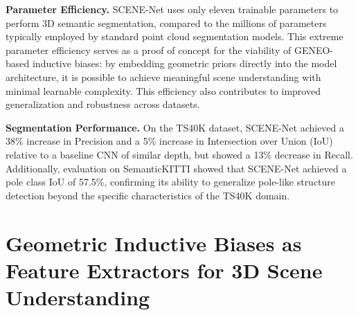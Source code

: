 \textbf{Parameter Efficiency.} \;
SCENE-Net uses only eleven trainable parameters to perform 3D semantic
segmentation, compared to the millions of parameters typically employed by
standard point cloud segmentation models. This extreme parameter efficiency
serves as a proof of concept for the viability of GENEO-based inductive biases:
by embedding geometric priors directly into the model architecture, it is
possible to achieve meaningful scene understanding with minimal learnable
complexity. This efficiency also contributes to improved generalization and
robustness across datasets.

\textbf{Segmentation Performance.} \;
On the TS40K dataset, SCENE-Net achieved a 38\% increase in Precision and a 5\%
increase in Intersection over Union (IoU) relative to a baseline CNN of similar
depth, but showed a 13\% decrease in Recall.
%
Additionally, evaluation on SemanticKITTI showed that SCENE-Net achieved a pole
class IoU of 57.5\%, confirming its ability to generalize pole-like structure
detection beyond the specific characteristics of the TS40K domain.





\section{Geometric Inductive Biases as Feature Extractors for 3D Scene Understanding}\label{scenenetv2}

